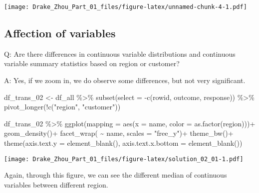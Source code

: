 \documentclass[
]{article}
\newenvironment{Shaded}{\begin{snugshade}}{\end{snugshade}}
\newcommand{\AttributeTok}[1]{\textcolor[rgb]{0.77,0.63,0.00}{#1}}
\newcommand{\FunctionTok}[1]{\textcolor[rgb]{0.00,0.00,0.00}{#1}}
\newcommand{\NormalTok}[1]{#1}
\newcommand{\OtherTok}[1]{\textcolor[rgb]{0.56,0.35,0.01}{#1}}
\newcommand{\SpecialCharTok}[1]{\textcolor[rgb]{0.00,0.00,0.00}{#1}}
\newcommand{\StringTok}[1]{\textcolor[rgb]{0.31,0.60,0.02}{#1}}
\begin{document}
\texttt{[image: Drake\_Zhou\_Part\_01\_files/figure-latex/unnamed-chunk-4-1.pdf]}

\hypertarget{affection-of-variables}{%
\subsection{Affection of variables}\label{affection-of-variables}}

Q: Are there differences in continuous variable distributions and
continuous variable summary statistics based on region or customer?

A: Yes, if we zoom in, we do observe some differences, but not very
significant.

\begin{Shaded}
\begin{Highlighting}[]
\NormalTok{df\_trans\_02 }\OtherTok{\textless{}{-}}\NormalTok{ df\_all }\SpecialCharTok{\%\textgreater{}\%}
  \FunctionTok{subset}\NormalTok{(}\AttributeTok{select =} \SpecialCharTok{{-}}\FunctionTok{c}\NormalTok{(rowid, outcome, response)) }\SpecialCharTok{\%\textgreater{}\%} 
  \FunctionTok{pivot\_longer}\NormalTok{(}\SpecialCharTok{!}\FunctionTok{c}\NormalTok{(}\StringTok{"region"}\NormalTok{, }\StringTok{"customer"}\NormalTok{))}
  
\NormalTok{df\_trans\_02 }\SpecialCharTok{\%\textgreater{}\%}
  \FunctionTok{ggplot}\NormalTok{(}\AttributeTok{mapping =} \FunctionTok{aes}\NormalTok{(}\AttributeTok{x =}\NormalTok{ name, }\AttributeTok{color =} \FunctionTok{as.factor}\NormalTok{(region)))}\SpecialCharTok{+}
  \FunctionTok{geom\_density}\NormalTok{()}\SpecialCharTok{+}
  \FunctionTok{facet\_wrap}\NormalTok{( }\SpecialCharTok{\textasciitilde{}}\NormalTok{ name, }\AttributeTok{scales =} \StringTok{"free\_y"}\NormalTok{)}\SpecialCharTok{+}
  \FunctionTok{theme\_bw}\NormalTok{()}\SpecialCharTok{+}
  \FunctionTok{theme}\NormalTok{(}\AttributeTok{axis.text.y =} \FunctionTok{element\_blank}\NormalTok{(), }\AttributeTok{axis.text.x.bottom =} \FunctionTok{element\_blank}\NormalTok{())}
\end{Highlighting}
\end{Shaded}

\texttt{[image: Drake\_Zhou\_Part\_01\_files/figure-latex/solution\_02\_01-1.pdf]}

Again, through this figure, we can see the different median of
continuous variables between different region.
\end{document}
